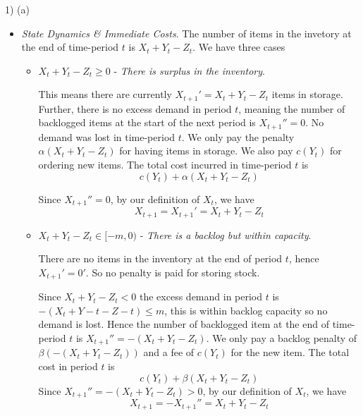\documentclass[11pt,a4paper]{article}
\begin{document}
\begin{answer}{1) (a)}
\begin{itemize}
    \item \textit{State Dynamics \& Immediate Costs}.
    The number of items in the invetory at the end of time-period $t$ is $X_t+Y_t-Z_t$.
    We have three cases
    \begin{itemize}
      \item $X_t+Y_t-Z_t\geq0$ - \textit{There is surplus in the inventory}.
      \par This means there are currently $X_{t+1}'=X_t+Y_t-Z_t$ items in storage. Further, there is no excess demand in period $t$, meaning the number of backlogged items at the start of the next period is $X_{t+1}''=0$. No demand was lost in time-period $t$.  We only pay the penalty $\alpha(X_t+Y_t-Z_t)$ for having items in storage. We also pay $c(Y_t)$ for ordering new items. The total cost incurred in time-period $t$ is
      \[ c(Y_t)+\alpha(X_t+Y_t-Z_t) \]
      \par Since $X_{t+1}''=0$, by our definition of $X_t$, we have
      \[ X_{t+1}=X_{t+1}'=X_t+Y_t-Z_t \]

      \item $X_t+Y_t-Z_t\in[-m,0)$ - \textit{There is a backlog but within capacity}.
      \par There are no items in the inventory at the end of period $t$, hence $X_{t+1}'=0'$. So no penalty is paid for storing stock.
      \par Since $X_t+Y_t-Z_t<0$ the excess demand in period $t$ is $-(X_t+Y-t-Z-t)\leq m$, this is within backlog capacity so no demand is lost. Hence the number of backlogged item at the end of time-period $t$ is $X_{t+1}''=-(X_t+Y_t-Z_t)$. We only pay a backlog penalty of $\beta(-(X_t+Y_t-Z_t))$ and a fee of $c(Y_t)$ for the new item. The total cost in period $t$ is
      \[ c(Y_t)+\beta(X_t+Y_t-Z_t) \]
      Since $X_{t+1}''=-(X_t+Y_t-Z_t)>0$, by our definition of $X_t$, we have
      \[ X_{t+1}=-X_{t+1}''=X_t+Y_t-Z_t \]


\end{itemize}
\end{itemize}
\end{answer}
\end{document}
